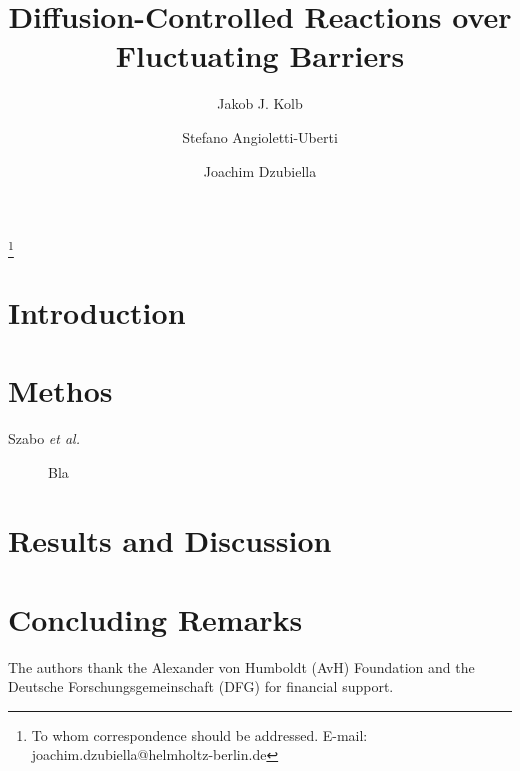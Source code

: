 \documentclass[twocolumn,superscriptaddress]{revtex4}
\begin{document}
 

\title{Diffusion-Controlled Reactions over Fluctuating Barriers} 

\author{Jakob J. Kolb}
\author{Stefano Angioletti-Uberti}
\author{Joachim Dzubiella}
\thanks{To whom correspondence should be addressed. E-mail: joachim.dzubiella@helmholtz-berlin.de}



\begin{abstract}
    
\end{abstract}

\maketitle

\section{Introduction}

\section{Methos}

Szabo {\it et al.}~\cite{szabo:jcp:1982}

\begin{figure}[h]
\caption{Bla}
\label{fig1}
\end{figure}

\section{Results and Discussion}

\section{Concluding Remarks}

\acknowledgments
The authors thank the Alexander von Humboldt (AvH) Foundation and the Deutsche Forschungsgemeinschaft (DFG) 
for financial support. 


\end{document}
